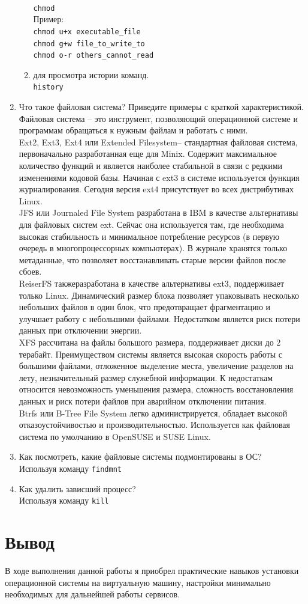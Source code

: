 \documentclass[12pt]{article}
\begin{document}
\begin{enumerate}
\begin{enumerate}
            \\\texttt{chmod}
            \\Пример:
            \\\texttt{chmod u+x executable\_file}
            \\\texttt{chmod g+w file\_to\_write\_to}
            \\\texttt{chmod o-r others\_cannot\_read}
          \item для просмотра истории команд.
            \\\texttt{history}
        \end{enumerate}
      \item Что такое файловая система? Приведите примеры с краткой характеристикой.
        \\Файловая система – это инструмент, позволяющий операционной системе и программам обращаться к нужным файлам и работать с ними.
        \\Ext2, Ext3, Ext4 или Extended Filesystem– стандартная файловая система, первоначально разработанная еще для Minix. Содержит максимальное количество функций и является наиболее стабильной в связи с редкими изменениями кодовой базы. Начиная с ext3 в системе используется функция журналирования. Сегодня версия ext4 присутствует во всех дистрибутивах Linux. 
        \\JFS или Journaled File System разработана в IBM в качестве альтернативы для файловых систем ext. Сейчас она используется там, где необходима высокая стабильность и минимальное потребление ресурсов (в первую очередь в многопроцессорных компьютерах). В журнале хранятся только метаданные, что позволяет восстанавливать старые версии файлов после сбоев.
        \\ReiserFS такжеразработана в качестве альтернативы ext3, поддерживает только Linux. Динамический размер блока позволяет упаковывать несколько небольших файлов в один блок, что предотвращает фрагментацию и улучшает работу с небольшими файлами. Недостатком является риск потери данных при отключении энергии. 
        \\XFS рассчитана на файлы большого размера, поддерживает диски до 2 терабайт. Преимуществом системы является высокая скорость работы с большими файлами, отложенное выделение места, увеличение разделов на лету, незначительный размер служебной информации. К недостаткам относится невозможность уменьшения размера, сложность восстановления данных и риск потери файлов при аварийном отключении питания.
        \\Btrfs или B-Tree File System легко администрируется, обладает высокой отказоустойчивостью и производительностью. Используется как файловая система по умолчанию в OpenSUSE и SUSE Linux.
      \item Как посмотреть, какие файловые системы подмонтированы в ОС?
        \\Используя команду \texttt{findmnt}
      \item Как удалить зависший процесс?
        \\ Используя команду \texttt{kill}
    \end{enumerate}
  \section{Вывод}
    В ходе выполнения данной работы я приобрел практические навыков установки операционной системы на виртуальную машину, настройки минимально необходимых для дальнейшей работы сервисов. 
\end{document}
